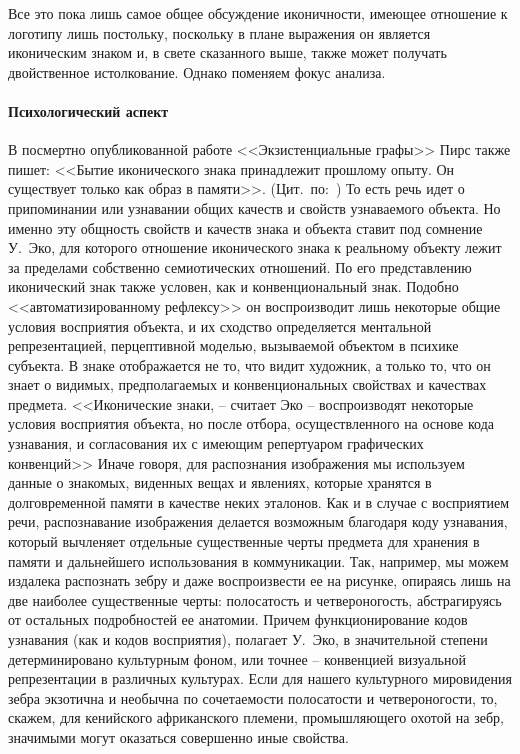 Все это пока лишь самое общее обсуждение иконичности, имеющее отношение
к логотипу лишь постольку, поскольку в плане выражения он  является иконическим
знаком и, в свете сказанного выше, также может получать двойственное
истолкование. Однако поменяем  фокус анализа.

\paragraph{Психологический аспект}

В посмертно опубликованной работе
<<Экзистенциальные графы>> Пирс также пишет: <<Бытие иконического знака принадлежит
прошлому опыту. Он существует только как образ в памяти>>.
(Цит.~по:~\autocite{jakobson1983}) То есть речь идет о припоминании или
узнавании общих качеств и свойств узнаваемого объекта. Но именно эту общность
свойств и качеств знака и объекта ставит под сомнение У.~Эко, для которого
отношение иконического знака к реальному объекту лежит за пределами собственно
семиотических отношений. По его представлению иконический знак также условен,
как и конвенциональный знак. Подобно <<автоматизированному рефлексу>>  он
воспроизводит лишь некоторые общие условия восприятия объекта, и их сходство
определяется ментальной репрезентацией, перцептивной моделью, вызываемой
объектом в психике субъекта. В знаке отображается не то, что видит художник,
а только то, что он знает о видимых, предполагаемых и конвенциональных свойствах
и качествах предмета. <<Иконические знаки, -- считает Эко -- воспроизводят
некоторые условия восприятия объекта, но после отбора, осуществленного на
основе кода узнавания, и согласования их с имеющим репертуаром графических
конвенций>>\autocite[][160]{eko1998} Иначе говоря, для распознания
изображения мы используем данные о знакомых, виденных вещах и явлениях, которые
хранятся в долговременной памяти в качестве неких эталонов.  Как и в случае с
восприятием речи, распознавание изображения делается возможным благодаря коду
узнавания, который вычленяет отдельные существенные черты предмета для хранения
в памяти и дальнейшего использования в коммуникации. Так, например, мы можем
издалека распознать зебру и даже воспроизвести ее на рисунке, опираясь лишь на
две наиболее существенные черты: полосатость и четвероногость, абстрагируясь от
остальных подробностей ее анатомии. Причем функционирование кодов узнавания
(как и кодов восприятия), полагает У.~Эко, в значительной степени детерминировано
культурным фоном, или точнее -- конвенцией визуальной репрезентации в различных
культурах. Если для нашего культурного мировидения  зебра экзотична и необычна
по сочетаемости полосатости и четвероногости, то, скажем, для кенийского
африканского племени, промышляющего охотой на зебр, значимыми могут оказаться
совершенно иные свойства\autocite[][160]{eko1998}.

